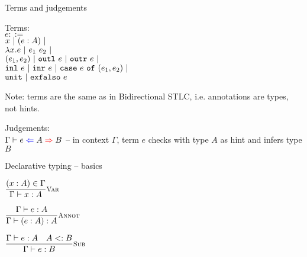 \documentclass{beamer}
\begin{document}
\begin{frame}{Terms and judgements}

Terms: \\
$e ::=$ \\
\qquad $x \pipe \annot{e}{A} \pipe$ \\
\qquad $\fun{x}{e} \pipe \app{e_1}{e_2} \pipe$ \\
\qquad $\pair{e_1}{e_2} \pipe \outl{e} \pipe \outr{e} \pipe$ \\
\qquad $\inl{e} \pipe \inr{e} \pipe \case{e}{e_1}{e_2} \pipe$ \\
\qquad $\unit \pipe \exfalso{e}$

\vspace{2em}

Note: terms are the same as in Bidirectional STLC, i.e. annotations are types, not hints.

\vspace{2em}

Judgements: \\
$\fullhinting{\Gamma}{e}{A}{B}$ -- in context $\Gamma$, term $e$ checks with type $A$ as hint and infers type $B$

\end{frame}

\begin{frame}{Declarative typing -- basics}

\begin{center}
  $\infrule[Var]{\sidecond{(x : A) \in \Gamma}}{\typing{x}{A}}$

  \vspace{2em}

  $\infrule[Annot]{\typing{e}{A}}{\typing{\annot{e}{A}}{A}}$

  \vspace{2em}

  $\infrule[Sub]{\typing{e}{A} \quad \sidecond{\subtyping{A}{B}}}{\typing{e}{B}}$
\end{center}

\end{frame}
\end{document}
